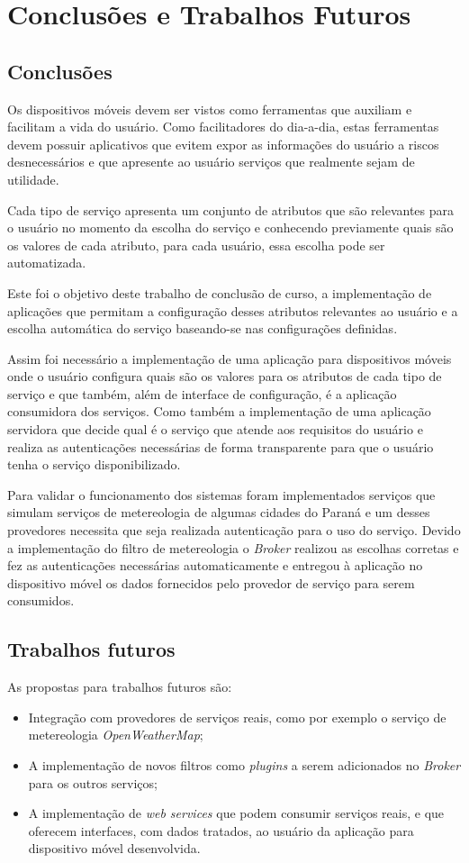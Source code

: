 \chapter{Conclusões e Trabalhos Futuros}\label{cha:conclusao}

\section{Conclusões}
Os dispositivos móveis devem ser vistos como ferramentas que auxiliam e facilitam a vida do usuário. Como facilitadores do dia-a-dia, estas ferramentas devem possuir aplicativos que evitem expor as informações do usuário a riscos desnecessários e que apresente ao usuário serviços que realmente sejam de utilidade.

Cada tipo de serviço apresenta um conjunto de atributos que são relevantes para o usuário no momento da escolha do serviço e conhecendo previamente quais são os valores de cada atributo, para cada usuário, essa escolha pode ser automatizada.

Este foi o objetivo deste trabalho de conclusão de curso, a implementação de aplicações que permitam a configuração desses atributos relevantes ao usuário e a escolha automática do serviço baseando-se nas configurações definidas.

Assim foi necessário a implementação de uma aplicação para dispositivos móveis onde o usuário configura quais são os valores para os atributos de cada tipo de serviço e que também, além de interface de configuração, é a aplicação consumidora dos serviços. Como também a implementação de uma aplicação servidora que decide qual é o serviço que atende aos requisitos do usuário e realiza as autenticações necessárias de forma transparente para que o usuário tenha o serviço disponibilizado.

Para validar o funcionamento dos sistemas foram implementados serviços que simulam serviços de metereologia de algumas cidades do Paraná e um desses provedores necessita que seja realizada autenticação para o uso do serviço. Devido a implementação do filtro de metereologia o \textit{Broker} realizou as escolhas corretas e fez as autenticações necessárias automaticamente e entregou à aplicação no dispositivo móvel os dados fornecidos pelo provedor de serviço para serem consumidos.

\section{Trabalhos futuros}
As propostas para trabalhos futuros são:
\begin{itemize}
	\item Integração com provedores de serviços reais, como por exemplo o serviço de metereologia \textit{OpenWeatherMap};
	\item A implementação de novos filtros como \textit{plugins} a serem adicionados no \textit{Broker} para os outros serviços;
	\item A implementação de \textit{web services} que podem consumir serviços reais, e que oferecem interfaces, com dados tratados, ao usuário da aplicação para dispositivo móvel desenvolvida.
\end{itemize}